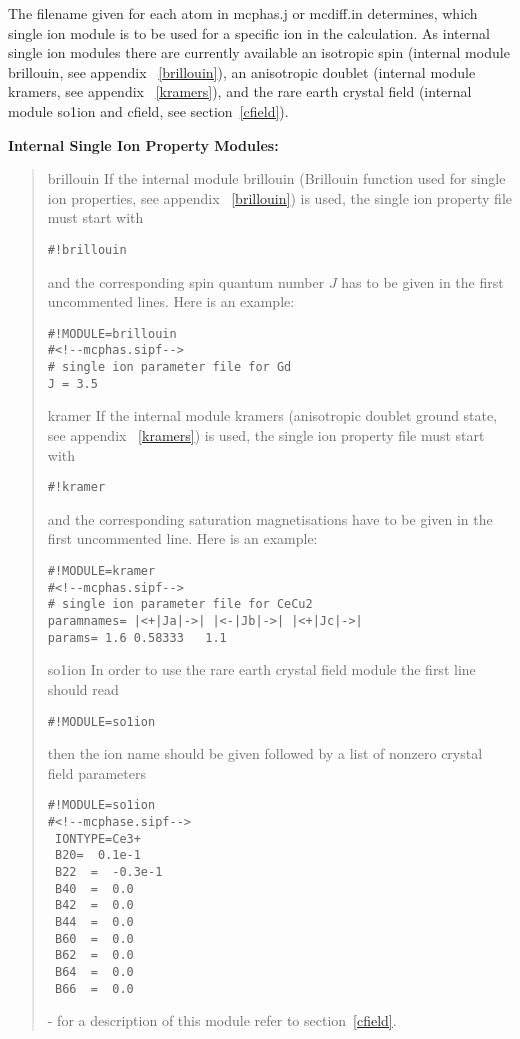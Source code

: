The filename given for each atom in {\prg mcphas.j}
or {\prg mcdiff.in} determines, which single ion module 
is to be used for a specific ion in the calculation.
As internal single ion modules there are currently available an isotropic spin (internal module {\prg brillouin}, %
see
appendix ~\ref{brillouin}), an 
 anisotropic doublet (internal module {\prg kramers}, see appendix ~\ref{kramers}), 
and the rare earth crystal field (internal module {\prg so1ion} and
cfield, see section~\ref{cfield}).

\vspace{0.5cm} 
{\bf Internal Single Ion Property Modules:} 
\begin{quote}
\item[{\prg brillouin}]
If the internal module {\prg brillouin}
 (Brillouin function used for single ion properties,
  see appendix ~\ref{brillouin}) is used,
the single ion property file must start with
\begin{verbatim}#!brillouin\end{verbatim} and
the corresponding spin
 quantum number $J$ has to be given in the first uncommented
lines.
Here is an example:
\begin{verbatim}
#!MODULE=brillouin
#<!--mcphas.sipf-->
# single ion parameter file for Gd
J = 3.5
\end{verbatim}
\item [{\prg kramer}] If the internal module {\prg kramers} (anisotropic doublet ground state, see appendix %
~\ref{kramers}) is used,
the single ion property file must start with
\begin{verbatim}#!kramer\end{verbatim} and
the corresponding saturation magnetisations have to be given in the first uncommented
line.
Here is an example:
\begin{verbatim}
#!MODULE=kramer
#<!--mcphas.sipf-->
# single ion parameter file for CeCu2
paramnames= |<+|Ja|->| |<-|Jb|->| |<+|Jc|->|
params= 1.6 0.58333   1.1
\end{verbatim}
\item[{\prg so1ion\index{so1ion}}]In order to use the rare earth crystal field module the first line should read
\begin{verbatim}#!MODULE=so1ion\end{verbatim}

then the ion name should be given followed by a list of nonzero crystal field parameters

\begin{verbatim}
#!MODULE=so1ion
#<!--mcphase.sipf-->
 IONTYPE=Ce3+
 B20=  0.1e-1                                           
 B22  =  -0.3e-1                                       
 B40  =  0.0
 B42  =  0.0
 B44  =  0.0
 B60  =  0.0
 B62  =  0.0
 B64  =  0.0
 B66  =  0.0
\end{verbatim}

 - for a description of this module refer
to section~\ref{cfield}.
\end{quote}

